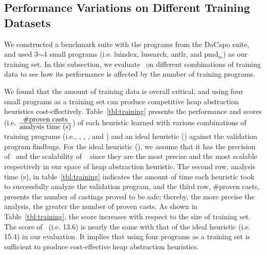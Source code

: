 
\subsection{Performance Variations on Different Training Datasets}\label{sec:justify}

We constructed a benchmark suite with the programs from the DaCapo suite,
and used 3$\sim$4 small programs (i.e. luindex, lusearch, antlr, and pmd$_{m}$) as our training set.
In this subsection, we evaluate \ourtool~on different combinations of training data to see how its performance is affected by the number of training programs.



We found that the amount of training data is overall critical, and
using four small programs as a training set can produce competitive heap abstraction heuristics cost-effectively.
Table~\ref{tbl:training} presents the performance and scores
(i.e. ${\mbox{\#proven casts}}\over{\mbox{analysis time (s)}}$)
of each heuristic learned with various combinations of training programs (i.e., \onepgm, \twopgm, \threepgm, and \fourpgm) and an ideal heuristic (\ideal) against the validation program findbugs.
For the ideal heuristic (\ideal), we assume that it has the precision of \Mahjong~and the scalability of \TypeBased~
since they are the most precise and the most scalable respectively in our space of heap abstraction heuristic.
The second row, analysis time (s), in table~\ref{tbl:training} indicates the amount of time each heuristic took to successfully analyze the validation program, and
the third row, \#proven casts, presents the number of castings proved to be safe;
thereby, the more precise the analysis, the greater the number of proven casts.
As shown in Table~\ref{tbl:training}, the score increases with respect to the size of training set.
The score of \fourpgm~(i.e. 13.6) is nearly the same with that of the ideal heuristic (i.e. 15.4) in our evaluation.
It implies that using four programs as a training set is sufficient to produce cost-effective heap abstraction heuristics.


